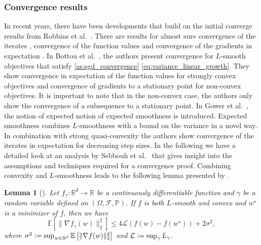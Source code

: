 \documentclass[12pt]{article}
\newtheorem{lemma}[lemma]{Lemma}
\theoremstyle{definition}
\numberwithin{equation}{section}
\newcommand{\R}{\mathbb{R}}
\newcommand{\BP}{\mathbb{P}}
\newcommand{\CF}{\mathcal{F}}
\newcommand{\CL}{\mathcal{L}}
\newcommand{\ev}[1]{\mathbb{E}\left[{#1}\right]}
\newcommand{\norm}[1]{\lVert{#1}\rVert_2}
\newcommand{\defeq}{\vcentcolon=}
\begin{document}
\subsubsection{Convergence results}
In recent years, there have been developments that build on the initial converge results from Robbins et al.\ \autocite{robbinsStochasticApproximationMethod1951}. There are results for almost sure convergence of the iterates \autocite{zhouStochasticMirrorDescent2017, nguyenSGDHogwildConvergence2018, sebbouhAlmostSureConvergence2021}, convergence of the function values and convergence of the gradients in expectation \autocite{bottouOptimizationMethodsLargeScale2018}.  
In Bottou et al.\ \autocite{bottouOptimizationMethodsLargeScale2018}, the authors present convergence for $L$-smooth objectives that satisfy \autoref{as:sgd_convergence} \ref{eq:variance_linear_growth}. They show convergence in expectation of the function values for strongly convex objectives and convergence of gradients to a stationary point for non-convex objectives. It is important to note that in the non-convex case, the authors only show the convergence of a subsequence to a stationary point. In Gower et al.\ \autocite{gowerSGDGeneralAnalysis2019}, the notion of expected notion of expected smoothness is introduced. Expected smoothness combines $L$-smoothness with a bound on the variance in a novel way. In combination with strong quasi-convexity the authors show convergence of the iterates in expectation for decreasing step sizes.
In the following we have a detailed look at an analysis by Sebbouh et al.\ \autocite{sebbouhAlmostSureConvergence2021} that gives insight into the assumptions and techniques required for a convergence proof.
Combining convexity and $L$-smoothness leads to the following lemma presented by \autocite{sebbouhAlmostSureConvergence2021}.
\begin{lemma}[]
  \label{lemma:gradient_inequality}
  Let $f_{\gamma} : \R^d \rightarrow \R$ be a continuously differentiable function and $\gamma$ be a random variable defined on $(\Omega, \CF, \BP)$. If $f$ is both $L$-smooth and convex and $w^\star$ is a minimizer of $f$, then we have
  \begin{equation}
    \ev{\norm{\nabla f_{\gamma}(w)}^2} \leq 4 \CL (f(w) - f(w^\star)) + 2 \sigma^2,
  \end{equation}
  where $\sigma^2 \defeq \sup_{w \in \R^d} \ev{\norm{\nabla f(w)}^2}$ and $\CL \defeq \sup_{\gamma} L_{\gamma}$.
\end{lemma}
\end{document}
